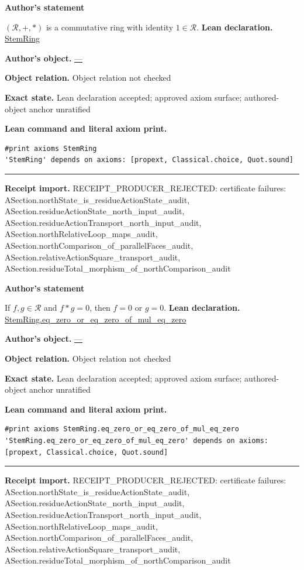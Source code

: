 \documentclass[11pt]{article}
\theoremstyle{plain}
\theoremstyle{definition}
\theoremstyle{remark}
\begin{document}
\medskip
\begin{tcolorbox}[provenancecard,title={21. Proposition},title after break={21. Proposition (continued)}]
\textbf{Author's statement}\par
$(\mathcal R,+,\ast)$ is a commutative ring with identity $1\in\mathcal R$.
\tcblower
\textbf{Lean declaration.} \url{StemRing}
\par\textbf{Author's object.} \url{—}
\par\textbf{Object relation.} Object relation not checked
\par\textbf{Exact state.} Lean declaration accepted; approved axiom surface; authored-object anchor unratified
\par\smallskip\textbf{Lean command and literal axiom print.}
\begin{Verbatim}[breaklines=true,breakanywhere=true,fontsize=\small]
#print axioms StemRing
'StemRing' depends on axioms: [propext, Classical.choice, Quot.sound]
\end{Verbatim}
\medskip\hrule\medskip
\textbf{Receipt import.} \textcolor{KgtRed}{RECEIPT\_PRODUCER\_REJECTED: certificate failures: ASection.northState\_is\_residueActionState\_audit, ASection.residueActionState\_north\_input\_audit, ASection.residueActionTransport\_north\_input\_audit, ASection.northRelativeLoop\_maps\_audit, ASection.northComparison\_of\_parallelFaces\_audit, ASection.relativeActionSquare\_transport\_audit, ASection.residueTotal\_morphism\_of\_northComparison\_audit}
\end{tcolorbox}
\medskip
\begin{tcolorbox}[provenancecard,title={22. Proposition - \$\textbackslash{}mathcal R\$ is an integral domain},title after break={22. Proposition - \$\textbackslash{}mathcal R\$ is an integral domain (continued)}]
\textbf{Author's statement}\par
If $f,g\in\mathcal R$ and $f\ast g=0$, then $f=0$ or $g=0$.
\tcblower
\textbf{Lean declaration.} \url{StemRing.eq_zero_or_eq_zero_of_mul_eq_zero}
\par\textbf{Author's object.} \url{—}
\par\textbf{Object relation.} Object relation not checked
\par\textbf{Exact state.} Lean declaration accepted; approved axiom surface; authored-object anchor unratified
\par\smallskip\textbf{Lean command and literal axiom print.}
\begin{Verbatim}[breaklines=true,breakanywhere=true,fontsize=\small]
#print axioms StemRing.eq_zero_or_eq_zero_of_mul_eq_zero
'StemRing.eq_zero_or_eq_zero_of_mul_eq_zero' depends on axioms: [propext, Classical.choice, Quot.sound]
\end{Verbatim}
\medskip\hrule\medskip
\textbf{Receipt import.} \textcolor{KgtRed}{RECEIPT\_PRODUCER\_REJECTED: certificate failures: ASection.northState\_is\_residueActionState\_audit, ASection.residueActionState\_north\_input\_audit, ASection.residueActionTransport\_north\_input\_audit, ASection.northRelativeLoop\_maps\_audit, ASection.northComparison\_of\_parallelFaces\_audit, ASection.relativeActionSquare\_transport\_audit, ASection.residueTotal\_morphism\_of\_northComparison\_audit}
\end{tcolorbox}
\end{document}
